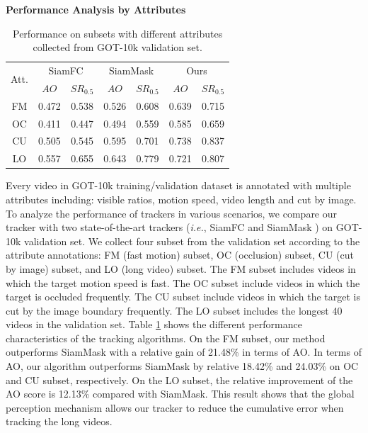 \textbf{Performance Analysis by Attributes} 
\begin{table}
\centering
\caption{Performance on subsets with different attributes collected from GOT-10k validation set.}
\begin{tabular}{|c|c|c|c|c|c|c|}
\hline
\multirow{2}{*}{Att.} &
\multicolumn{2}{c|}{SiamFC} & \multicolumn{2}{c|}{SiamMask} &\multicolumn{2}{c|}{Ours} \\
\cline{2-7} & $AO$ & $SR_{0.5}$ & $AO$ & $SR_{0.5}$ & $AO$ & $SR_{0.5}$ \\
\hline
FM & 0.472 & 0.538 & 0.526 & 0.608 & 0.639 & 0.715 \\
\hline
OC & 0.411 & 0.447 & 0.494 & 0.559 & 0.585 & 0.659 \\
\hline
CU & 0.505 & 0.545 & 0.595 & 0.701 & 0.738 & 0.837 \\
\hline
LO & 0.557 & 0.655 & 0.643 & 0.779 & 0.721 & 0.807 \\
\hline
\end{tabular}
\label{table:attribute}
\end{table}
Every video in GOT-10k training/validation dataset is annotated with multiple attributes including: visible ratios, motion speed, video length and cut by image. To analyze the performance of trackers in various scenarios, we compare our tracker with two state-of-the-art trackers (\textit{i.e.}, SiamFC  \cite{SiamFC} and SiamMask \cite{Wang2018SiamMask}) on GOT-10k validation set. We collect four subset from the validation set according to the attribute annotations: FM (fast motion) subset, OC (occlusion) subset, CU (cut by image) subset, and LO (long video) subset. 
The FM subset includes videos in which the target motion speed is fast.
The OC subset include videos in which the target is occluded frequently.
The CU subset include videos in which the target is cut by the image boundary frequently.
The LO subset includes the longest 40 videos in the validation set.
Table \ref{table:attribute} shows the different performance characteristics of the tracking algorithms.
On the FM subset, our method outperforms SiamMask \cite{Wang2018SiamMask} with a relative gain of 21.48\% in terms of AO. 
In terms of AO, our algorithm outperforms SiamMask by relative 18.42\% and 24.03\% on OC and CU subset, respectively. 
On the LO subset, the relative improvement of the AO score is 12.13\% compared with SiamMask. This result shows that the global perception mechanism allows our tracker to reduce the cumulative error when tracking the long videos.

